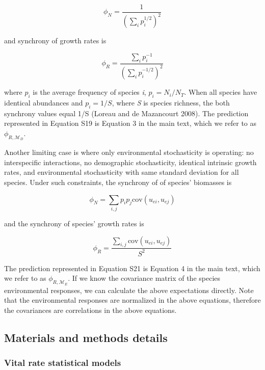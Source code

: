 \documentclass[12pt,]{article}
\begin{document}
\begin{equation}
\phi_N = \frac{1}{\left(\sum_i p_i^{1/2} \right)^2}
\end{equation}

\noindent and synchrony of growth rates is

\begin{equation}
\phi_R = \frac{\sum_i p_i^{-1}}{\left(\sum_i p_i^{-1/2} \right)^2}
\end{equation}

\noindent where \(p_i\) is the average frequency of species \emph{i},
\(p_i = N_i/N_T\). When all species have identical abundances and
\(p_i = 1/S\), where \emph{S} is species richness, the both synchrony
values equal 1/S (Loreau and {{de Mazancourt}} 2008). The prediction
represented in Equation S19 is Equation 3 in the main text, which we
refer to as \(\phi_{R,\mathcal{M}_D}\).

Another limiting case is where only environmental stochasticity is
operating: no interspecific interactions, no demographic stochasticity,
identical intrinsic growth rates, and environmental stochasticity with
same standard deviation for all species. Under such constraints, the
synchrony of of species' biomasses is

\begin{equation}
\phi_N = \sum_{i,j} p_i p_j \text{cov}(u_{ei}, u_{ej})
\end{equation}

\noindent{} and the synchrony of species' growth rates is

\begin{equation}
\phi_R = \frac{\sum_{i,j} \text{cov}(u_{ei}, u_{ej})}{S^2}
\end{equation}

\noindent The prediction represented in Equation S21 is Equation 4 in
the main text, which we refer to as \(\phi_{R,\mathcal{M}_E}\). If we
know the covariance matrix of the species environmental responses, we
can calculate the above expectations directly. Note that the
environmental responses are normalized in the above equations, therefore
the covariances are correlations in the above equations.

\newpage{}

\subsection{Materials and methods
details}\label{materials-and-methods-details}

\subsubsection{Vital rate statistical
models}\label{vital-rate-statistical-models}
\end{document}
